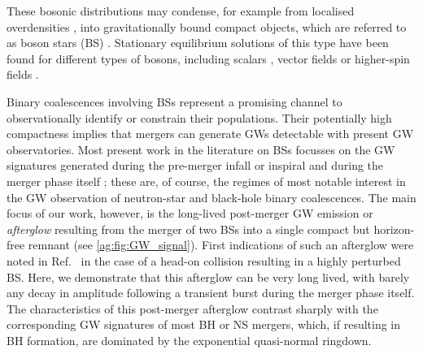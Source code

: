 These bosonic distributions may condense, for example from localised overdensities \cite{Widdicombe:2018oeo}, into gravitationally bound compact objects, which are referred to as boson stars (BS) \cite{Amin:2018xfe,PhysRev.172.1331,PhysRev.187.1767,PhysRev.97.511,Visinelli:2021uve,Liebling:2012fv,Schunck:2003kk,Guerra:2019srj,Vaglio:2022flq,Cardoso:2022vpj,Amin:2021tnq,Zhang:2020bec}. Stationary equilibrium solutions of this type have been
found for different types of bosons, including scalars \cite{Sanchis-Gual:2020mzb,Alcubierre:2021psa,Boskovic:2021nfs,Astefanesei:2003qy,Kaup:1968zz,Ruffini:1969qy,Colpi:1986ye,Lee:1986ts,Friedberg:1986tq,Schunck:1999zu,Jetzer:1989av,Pugliese:2013gsa,Hawley:2002zn,Urena-Lopez:2012udq,Muia:2019coe,Helfer:2016ljl,Alcubierre:2018ahf,Coleman:1985ki,Guerra:2019srj,Kleihaus:2005me,Kleihaus:2011sx,Cardoso:2014sna,Amin:2014fua,Amin:2011hj,Amin:2010dc}, vector fields \cite{Brito:2015pxa,Minamitsuji:2018kof,Brito:2015yga,Zhang:2021xxa,CalderonBustillo:2022cja,March-Russell:2022zll,Gorghetto:2022sue,Herdeiro:2021lwl,Bustillo:2020syj,Minamitsuji:2017pdr,Sanchis-Gual:2017bhw,Duarte:2016lig,SalazarLandea:2016bys,Zilhao:2015tya} or higher-spin fields \cite{Jain:2021pnk}.

Binary coalescences involving BSs
represent a promising channel to observationally
identify or constrain their populations. Their potentially high compactness implies that mergers can generate GWs detectable with present GW observatories. Most present work in the literature on BSs focusses on the GW signatures generated during the pre-merger infall or inspiral
\cite{Herdeiro:2020kba,Cardoso:2017cfl,Sennett:2017etc,Diamond:2021dth,Pacilio:2020jza} and during the
merger phase itself \cite{Amin:2020vja,Sanchis-Gual:2018oui,Sanchis-Gual:2020mzb,Sanchis_Gual_2019,Widdicombe:2019woy,
Helfer:2018vtq,Palenzuela:2017kcg,Bezares:2018qwa,Liebling:2012fv,Choptuik:2009ww,Palenzuela:2007dm,Bezares:2017mzk,
Palenzuela:2006wp,Dietrich:2018jov,Dietrich:2018bvi,Jaramillo:2022zwg,Bezares:2022obu,Macedo:2013jja}; these are, of course, the regimes of most notable
interest in the GW observation of neutron-star and black-hole
binary coalescences. The main focus of our work, however, is
the long-lived post-merger GW emission or {\it afterglow} resulting
from the merger of two BSs into a single compact but horizon-free
remnant (see \ref{ag:fig:GW_signal}).
First indications of such an afterglow were noted in Ref.~\cite{Helfer:2018vtq} in the case of a head-on collision resulting in a highly perturbed BS. Here, we demonstrate that this afterglow can be very long lived, with barely any decay in amplitude following a transient burst during the merger phase itself. The characteristics of this post-merger afterglow contrast sharply with the corresponding GW signatures of most BH or NS mergers, which, if
resulting in BH formation, are dominated by the exponential quasi-normal ringdown. 




